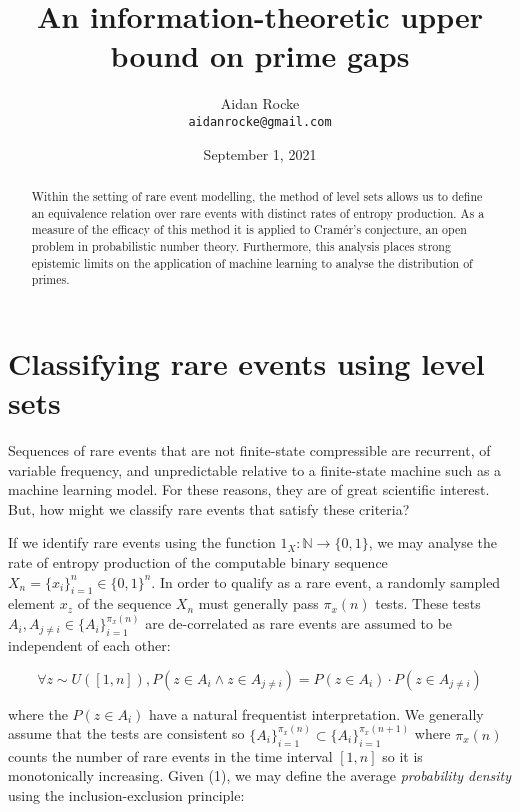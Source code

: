 \documentclass{article}
\title{An information-theoretic upper bound on prime gaps}
\date{September 1, 2021}
\author{%
  Aidan Rocke\\
  \texttt{aidanrocke@gmail.com} \\
}
\begin{document}
\maketitle

\begin{abstract}
Within the setting of rare event modelling, the method of level sets allows 
us to define an equivalence relation over rare events with distinct rates of entropy production. As a measure of the efficacy of this method it is applied to Cramér's conjecture, an open problem in probabilistic number theory. Furthermore, this analysis places strong epistemic limits on the
application of machine learning to analyse the distribution of primes.
\end{abstract}

\section{Classifying rare events using level sets}
 
Sequences of rare events that are not finite-state compressible are recurrent, of variable frequency, and unpredictable relative to a finite-state machine such as a machine learning model. For these reasons, they are of great scientific interest. But, how might we classify rare events that satisfy these criteria? 

If we identify rare events using the function $1_X: \mathbb{N} \rightarrow \{0,1\}$, we may analyse the rate of
entropy production of the computable binary sequence $X_n = \{x_i\}_{i=1}^n \in \{0,1\}^n$. In order to qualify as a rare event, a randomly sampled element $x_z$ of the sequence $X_n$ must generally
pass $\pi_x(n)$ tests. These tests $A_i, A_{j \neq i} \in \{A_i\}_{i=1}^{\pi_x(n)}$ are de-correlated as rare events are assumed to be independent of each other: 

\begin{equation}
\forall z \sim U([1,n]), P(z \in A_i \land z \in A_{j \neq i}) = P(z \in A_i ) \cdot P(z \in A_{j \neq i})
\end{equation}

where the $P(z \in A_i )$ have a natural frequentist interpretation. We generally assume that the tests are consistent so $\{A_i\}_{i=1}^{\pi_x(n)} \subset \{A_i\}_{i=1}^{\pi_x(n+1)}$ where $\pi_{x}(n)$ counts the number of rare events in the time interval $[1,n]$ so it is monotonically increasing. Given (1), we may define the average \textit{probability density} using the inclusion-exclusion principle:
\end{document}
